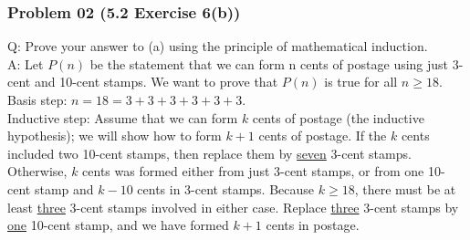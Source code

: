 \documentclass[14pt,hyperref={bookmarks=false}]{beamer}
\begin{document}
	\begin{frame}
	\frametitle{Problem 02 (5.2 Exercise 6(b))}
	\fontsize{10}{10pt}\selectfont
	Q: Prove your answer to (a) using the principle of mathematical
induction.\\
    \vspace*{0.1cm}
    A: Let $P(n)$ be the statement that we can form n cents of postage using just 3-cent and 10-cent stamps. We want to prove that $P(n)$ is true for all $n \geq 18$.\\
\vspace*{0.1cm}
Basis step: $n = 18 = 3 + 3 + 3 + 3 + 3 + 3$. \\
\vspace*{0.1cm}
Inductive step: Assume that we can form $k$ cents of postage (the inductive hypothesis); we will show how to form $k + 1$ cents of postage. If the $k$ cents included two 10-cent stamps, then replace them by \underline{seven} 3-cent stamps.\\
Otherwise, $k$ cents was formed either from just 3-cent stamps, or from one 10-cent stamp and $k-10$ cents in 3-cent stamps. Because $k \geq 18$, there must be at least \underline{three} 3-cent stamps involved in either case. Replace \underline{three} 3-cent stamps by \underline{one} 10-cent stamp, and we have formed $k + 1$ cents in postage.
	\end{frame}
	
\end{document}
